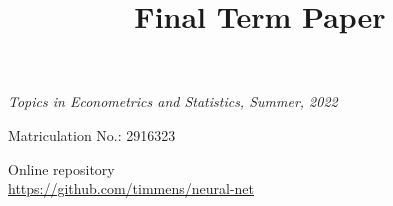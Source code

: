 \begin{frontmatter}

\title{Final Term Paper}

\vspace{0.5em}
\textit{Topics in Econometrics and Statistics, Summer, 2022}

\author{ }

\address{
Tim Mensinger\\
Institute for Finance and Statistics\\
University of Bonn\\
Adenauerallee 24-42\\
53113 Bonn, Germany\\
}


\vspace{0.5em}
Matriculation No.: 2916323

\vspace{0.5em}
Online repository\\
\url{https://github.com/timmens/neural-net}

\vspace{2em}
\begin{abstract}
    
\end{abstract}

\end{frontmatter}

